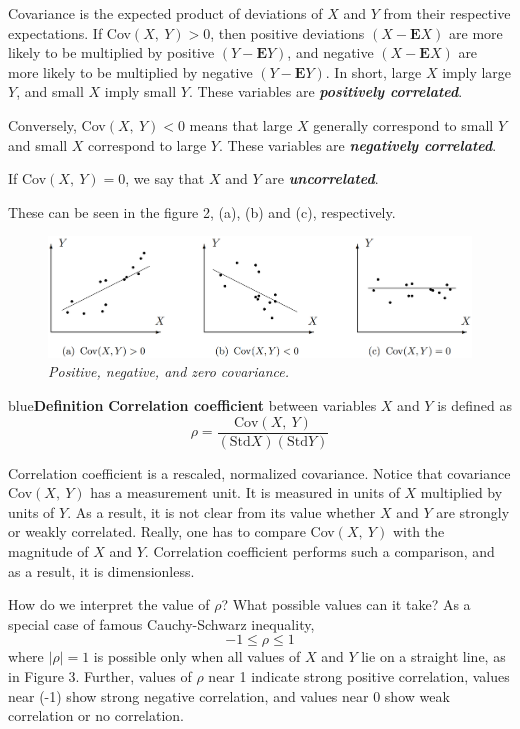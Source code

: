 \documentclass{article}
\newenvironment{definition}[1]{\begin{mybox}{blue}{\textbf{Definition #1}}}{\end{mybox}}
\begin{document}
Covariance is the expected product of deviations of $X$ and $Y$ from their respective expectations. If Cov$(X,\ Y) > 0$, then positive deviations $(X - \mathbf{E}X)$ are more likely to be multiplied by positive $(Y - \mathbf{E}Y)$, and negative $(X - \mathbf{E}X)$ are more likely to be multiplied by negative $(Y - \mathbf{E}Y)$. In short, large $X$ imply large $Y$, and small $X$ imply small $Y$. These variables are \textit{\textbf{positively correlated}}.

Conversely, Cov$(X,\ Y) < 0$ means that large $X$ generally correspond to small $Y$ and small $X$ correspond to large $Y$. These variables are \textit{\textbf{negatively correlated}}.

If Cov$(X,\ Y) = 0$, we say that $X$ and $Y$ are \textit{\textbf{uncorrelated}}.

These can be seen in the figure 2, (a), (b) and (c), respectively.

\begin{figure}[t]
    \centering
    \includegraphics[width=.6\textwidth]{img/fig3.4.png}
    \caption{\textit{Positive, negative, and zero covariance.}}
\end{figure}

\begin{definition}{}
\textbf{Correlation coefficient} between variables $X$ and $Y$ is defined as
\begin{equation*}
    \rho = \frac{\text{Cov}(X,\ Y)}{(\text{Std$X$})(\text{Std$Y$})}
\end{equation*}
\end{definition}

Correlation coefficient is a rescaled, normalized covariance. Notice that covariance Cov$(X,\ Y)$ has a measurement unit. It is measured in units of $X$ multiplied by units of $Y$. As a result, it is not clear from its value whether $X$ and $Y$ are strongly or weakly correlated. Really, one has to compare Cov$(X,\ Y)$ with the magnitude of $X$ and $Y$. Correlation coefficient performs such a comparison, and as a result, it is dimensionless.

How do we interpret the value of $\rho$? What possible values can it take? As a special case of famous Cauchy-Schwarz inequality,
\begin{equation*}
    -1 \leq \rho \leq 1
\end{equation*}
where $|\rho| = 1$ is possible only when all values of $X$ and $Y$ lie on a straight line, as in Figure 3. Further, values of $\rho$ near 1 indicate strong positive correlation, values near (-1) show strong negative correlation, and values near 0 show weak correlation or no correlation.
\end{document}
